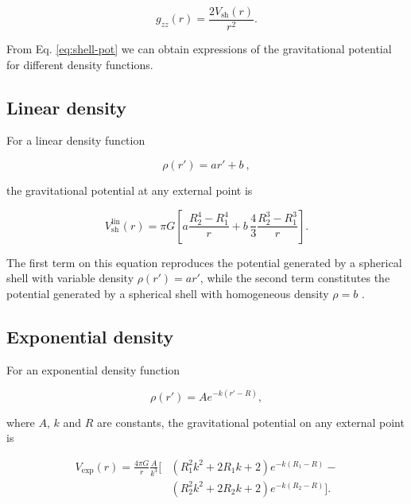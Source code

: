 \documentclass[extra, referee]{gji}
\begin{document}
\begin{equation}
    g_{zz}(r) = \frac{2V_\text{sh}(r)}{r^2}.
\end{equation}

From Eq. \ref{eq:shell-pot} we can obtain expressions of the gravitational potential for
different density functions.

\subsection{Linear density}

For a linear density function

\begin{equation}
    \rho(r') = ar' + b\ ,
\end{equation}

\noindent
the gravitational potential at any external point is

\begin{equation}
    V_\text{sh}^\text{lin}(r) = \pi G \left[
    a \frac{R_2^4 - R_1^4}{r} +
    b \,\frac{4}{3} \frac{R_2^3 - R_1^3}{r} \right].
    \label{eq:shell-pot-linear}
\end{equation}

\noindent The first term on this equation reproduces the potential generated
by a spherical shell with variable density $\rho(r') = ar'$, while the second
term constitutes the potential generated by a spherical shell with homogeneous
density $\rho = b$ \citep{Mikuska2006,Grombein2013}.

\subsection{Exponential density}

For an exponential density function

\begin{equation}
    \rho(r') = A e^{- k (r' - R)},
\end{equation}

\noindent
where $A$, $k$ and $R$ are constants, the gravitational potential on any external point
is

\begin{equation}
    \begin{split}
    V_\text{exp}(r) = \frac{4\pi G}{r} \frac{A}{k^3} \Big[
    & \left( R_1^2 k^2 + 2 R_1 k + 2 \right) e^{- k (R_1 - R)} - \\
    & \left( R_2^2 k^2 + 2 R_2 k + 2 \right) e^{- k (R_2 - R)}
    \Big].
    \end{split}
\end{equation}
\end{document}
